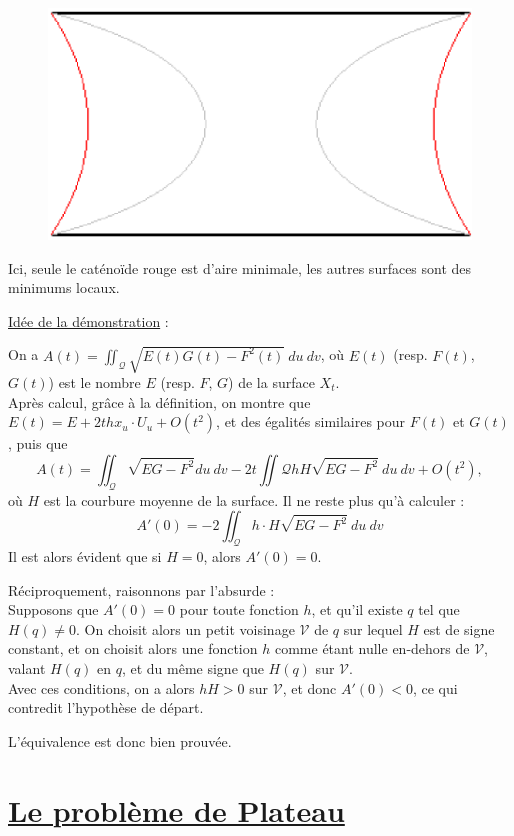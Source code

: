 \documentclass {report}
\begin{document}
\begin{figure}[h!]
      \centering 
      \includegraphics[scale=0.5]{Images_Fichiers/3a.eps}
\end{figure}

Ici, seule le caténoïde rouge est d'aire minimale, les autres surfaces sont des minimums locaux.

\uline{Idée de la démonstration} : 

On a $A(t) = \iint_{\mathscr{Q}}\sqrt{E(t)G(t)-F^2(t)}\ du \ dv$, où $E(t)$ (resp. $F(t)$, $G(t)$) est le nombre $E$ (resp. $F$, $G$) de la surface $X_t$.\\
Après calcul, grâce à la définition, on montre que $E(t)=E + 2th x_u \cdot U_u + O(t^2)$, et des égalités similaires pour $F(t)$ et $G(t)$, puis que 
$$A(t)= \iint_\mathscr{Q}\sqrt{EG-F^2}du\ dv - 2t\iint\mathscr{Q}hH\sqrt{EG-F^2}\ du\ dv + O(t^2),$$ où $H$ est la courbure moyenne de la surface.
Il ne reste plus qu'à calculer : $$A'(0) = - 2\iint_\mathscr{Q}h\cdot H\sqrt{EG-F^2}\ du\ dv $$
Il est alors évident que si $H = 0$, alors $A'(0)=0$. 

Réciproquement, raisonnons par l'absurde : \\
Supposons que $A'(0)=0$ pour toute fonction $h$, et qu'il existe $q$ tel que $H(q)\neq 0$. On choisit alors un petit voisinage $\mathscr{V}$ de $q$ sur lequel $H$ est de signe constant, et on choisit alors une fonction $h$ comme étant nulle en-dehors de $\mathscr{V}$, valant $H(q)$ en $q$, et du même signe que $H(q)$ sur $\mathscr{V}$. \\
Avec ces conditions, on a alors $hH>0$ sur $\mathscr{V}$, et donc $A'(0)<0$, ce qui contredit l'hypothèse de départ. 

L'équivalence est donc bien prouvée.

\chapter[Le problème de Plateau]{\uline{Le problème de Plateau}}
\end{document}
